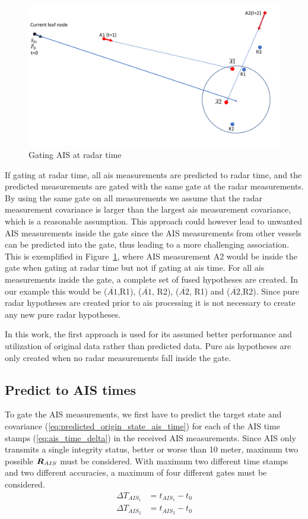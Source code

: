 \begin{figure}[H]
\centering
\includegraphics[width = .8\textwidth]{Figures/gating_at_radar_time.pdf}
\caption{Gating AIS at radar time}\label{fig:gating_ais_at_radar_time}
\end{figure}
If gating at radar time, all \gls{ais} measurements are predicted to radar time, and the predicted measurements are gated with the same gate at the radar measurements. By using the same gate on all measurements we assume that the radar measurement covariance is larger than the largest \gls{ais} measurement covariance, which is a reasonable assumption. This approach could however lead to unwanted AIS measurements inside the gate since the AIS measurements from other vessels can be predicted into the gate, thus leading to a more challenging association. This is exemplified in Figure~\ref{fig:gating_ais_at_radar_time}, where AIS measurement A2 would be inside the gate when gating at radar time but not if gating at \gls{ais} time. For all \gls{ais} measurements inside the gate, a complete set of fused hypotheses are created. In our example this would be (\(\overline{A1}\),R1), (\(\overline{A1}\), R2), (\(\overline{A2}\), R1) and (\(\overline{A2}\),R2). Since pure radar hypotheses are created prior to \gls{ais} processing it is not necessary to create any new pure radar hypotheses. 

In this work, the first approach is used for its assumed better performance and utilization of original data rather than predicted data. Pure \gls{ais} hypotheses are only created when no radar measurements fall inside the gate.

\subsection{Predict to AIS times}
To gate the AIS measurements, we first have to predict the target state and covariance (\ref{eq:predicted_origin_state_ais_time}) for each of the AIS time stamps (\ref{eq:ais_time_delta}) in the received AIS measurements. Since AIS only transmits a single integrity status, better or worse than 10 meter, maximum two possible \(\bm{R}_{AIS}\) must be considered. With maximum two different time stamps and two different accuracies, a maximum of four different gates must be considered.
\begin{equation}\label{eq:ais_time_delta}
\begin{split}
\Delta T_{AIS_1} &= t_{AIS_1} - t_{0} \\
\Delta T_{AIS_2} &= t_{AIS_2} - t_{0} \\
\end{split}
\end{equation}

